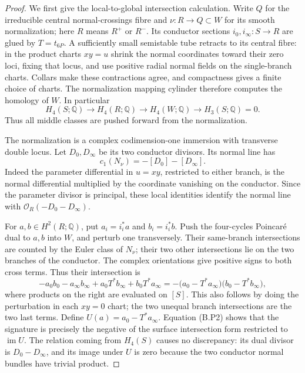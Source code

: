 \begin{proof}
We first give the local-to-global intersection calculation.
Write $Q$ for the irreducible central normal-crossings fibre and
$\nu:R\to Q\subset W$ for its smooth normalization; here $R$ means
$R^+$ or $R^-$.  Its conductor sections $i_0,i_\infty:S\to R$
are glued by $T=t_{6P}$.  A sufficiently small semistable tube
retracts to its central fibre: in the product charts $xy=u$ shrink
the normal coordinates toward their zero loci, fixing that locus,
and use positive radial normal fields on the single-branch charts.
Collars make these contractions agree, and compactness gives a
finite choice of charts.  The normalization mapping cylinder
therefore computes the homology of $W$.  In particular
\[
 H_4(S;\mathbb Q)\longrightarrow H_4(R;\mathbb Q)
 \longrightarrow H_4(W;\mathbb Q)\longrightarrow H_3(S;\mathbb Q)=0.
 \tag{B.P2}
\]
Thus all middle classes are pushed forward from the normalization.

The normalization is a complex codimension-one immersion with
transverse double locus.  Let $D_0,D_\infty$ be its two conductor
divisors.  Its normal line has
\[
 c_1(N_\nu)=-[D_0]-[D_\infty].
\]
Indeed the parameter differential in $u=xy$, restricted to either
branch, is the normal differential multiplied by the coordinate
vanishing on the conductor.  Since the parameter divisor is
principal, these local identities identify the normal line with
$\mathcal O_R(-D_0-D_\infty)$.

For $a,b\in H^2(R;\mathbb Q)$, put $a_i=i_i^*a$ and $b_i=i_i^*b$.
Push the four-cycles Poincar\'e dual to $a,b$ into $W$, and perturb
one transversely.  Their same-branch intersections are counted by
the Euler class of $N_\nu$; their two other intersections lie on
the two branches of the conductor.  The complex orientations give
positive signs to both cross terms.  Thus their intersection is
\[
 -a_0b_0-a_\infty b_\infty
       +a_0T^*b_\infty+b_0T^*a_\infty
   =-\bigl(a_0-T^*a_\infty\bigr)
         \bigl(b_0-T^*b_\infty\bigr),
 \tag{B.P3}
\]
where products on the right are evaluated on $[S]$.
This also follows by doing the perturbation in each $xy=0$ chart;
the two unequal branch intersections are the two last terms.
Define $U(a)=a_0-T^*a_\infty$.
Equation (B.P2) shows that the signature is precisely the negative
of the surface intersection form restricted to $\operatorname{im}U$.
The relation coming from $H_4(S)$ causes no discrepancy:
its dual divisor is $D_0-D_\infty$, and its image under $U$ is zero
because the two conductor normal bundles have trivial product.


\end{proof}

